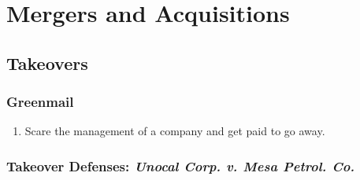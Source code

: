 \section{Mergers and Acquisitions}

\subsection{Takeovers}

\subsubsection{Greenmail}

\begin{enumerate}
    \item Scare the management of a company and get paid to go away.
\end{enumerate}

\subsubsection{Takeover Defenses: \emph{Unocal Corp. v. Mesa Petrol. Co.}}

